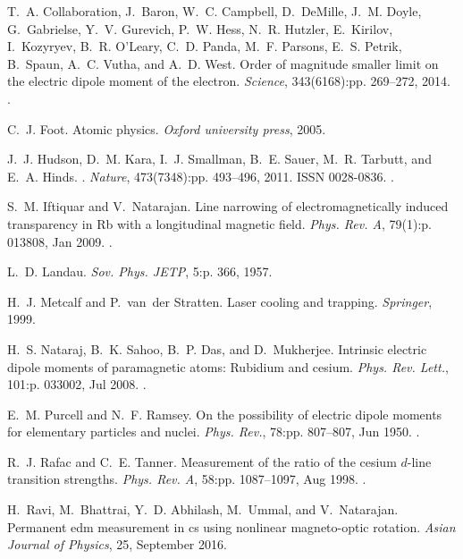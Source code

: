 \begin{thebibliography}{99}
T.~A. Collaboration, J.~Baron, W.~C. Campbell, D.~DeMille, J.~M. Doyle,
  G.~Gabrielse, Y.~V. Gurevich, P.~W. Hess, N.~R. Hutzler, E.~Kirilov,
  I.~Kozyryev, B.~R. O’Leary, C.~D. Panda, M.~F. Parsons, E.~S. Petrik,
  B.~Spaun, A.~C. Vutha, and A.~D. West.
\newblock Order of magnitude smaller limit on the electric dipole moment of the
  electron.
\newblock \emph{Science}, 343(6168):pp. 269--272, 2014.
\newblock {}.

C.~J. Foot.
\newblock Atomic physics.
\newblock \emph{Oxford university press}, 2005.

J.~J. Hudson, D.~M. Kara, I.~J. Smallman, B.~E. Sauer, M.~R. Tarbutt, and E.~A.
  Hinds.
.
\newblock \emph{Nature}, 473(7348):pp. 493--496, 2011.
\newblock ISSN 0028-0836.
\newblock {}.

S.~M. Iftiquar and V.~Natarajan.
\newblock Line narrowing of electromagnetically induced transparency in {Rb}
  with a longitudinal magnetic field.
\newblock \emph{Phys. Rev. A}, 79(1):p. 013808, Jan 2009.
\newblock {}.

L.~D. Landau.
\newblock \emph{Sov. Phys. JETP}, 5:p. 366, 1957.

H.~J. Metcalf and P.~van~der Stratten.
\newblock Laser cooling and trapping.
\newblock \emph{Springer}, 1999.

H.~S. Nataraj, B.~K. Sahoo, B.~P. Das, and D.~Mukherjee.
\newblock Intrinsic electric dipole moments of paramagnetic atoms: Rubidium and
  cesium.
\newblock \emph{Phys. Rev. Lett.}, 101:p. 033002, Jul 2008.
\newblock {}.

E.~M. Purcell and N.~F. Ramsey.
\newblock On the possibility of electric dipole moments for elementary
  particles and nuclei.
\newblock \emph{Phys. Rev.}, 78:pp. 807--807, Jun 1950.
\newblock {}.

R.~J. Rafac and C.~E. Tanner.
\newblock Measurement of the ratio of the cesium $d$-line transition strengths.
\newblock \emph{Phys. Rev. A}, 58:pp. 1087--1097, Aug 1998.
\newblock {}.

H.~Ravi, M.~Bhattrai, Y.~D. Abhilash, M.~Ummal, and V.~Natarajan.
\newblock Permanent edm measurement in cs using nonlinear magneto-optic
  rotation.
\newblock \emph{Asian Journal of Physics}, 25, September 2016.


\end{thebibliography}
